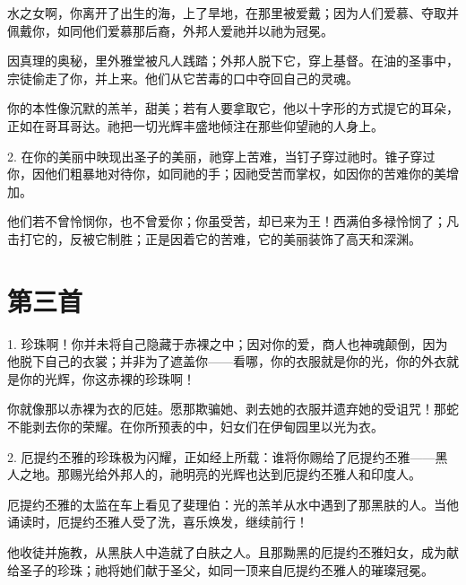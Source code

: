 水之女啊，你离开了出生的海，上了旱地，在那里被爱戴；因为人们爱慕、夺取并佩戴你，如同他们爱慕那后裔，外邦人爱祂并以祂为冠冕。\par

因真理的奥秘，里外雅堂被凡人践踏；外邦人脱下它，穿上基督。在油的圣事中，宗徒偷走了你，并上来。他们从它苦毒的口中夺回自己的灵魂。\par

你的本性像沉默的羔羊，甜美；若有人要拿取它，他以十字形的方式提它的耳朵，正如在哥耳哥达。祂把一切光辉丰盛地倾注在那些仰望祂的人身上。\par

2. 在你的美丽中映现出圣子的美丽，祂穿上苦难，当钉子穿过祂时。锥子穿过你，因他们粗暴地对待你，如同祂的手；因祂受苦而掌权，如因你的苦难你的美增加。\par

他们若不曾怜悯你，也不曾爱你；你虽受苦，却已来为王！西满伯多禄怜悯了；凡击打它的，反被它制胜；正是因着它的苦难，它的美丽装饰了高天和深渊。\par


\section{第三首}

1. 珍珠啊！你并未将自己隐藏于赤裸之中；因对你的爱，商人也神魂颠倒，因为他脱下自己的衣裳；并非为了遮盖你——看哪，你的衣服就是你的光，你的外衣就是你的光辉，你这赤裸的珍珠啊！\par

你就像那以赤裸为衣的厄娃。愿那欺骗她、剥去她的衣服并遗弃她的受诅咒！那蛇不能剥去你的荣耀。在你所预表的中，妇女们在伊甸园里以光为衣。\par

2. 厄提约丕雅的珍珠极为闪耀，正如经上所载：谁将你赐给了厄提约丕雅——黑人之地。那赐光给外邦人的，祂明亮的光辉也达到厄提约丕雅人和印度人。\par

厄提约丕雅的太监在车上看见了斐理伯：光的羔羊从水中遇到了那黑肤的人。当他诵读时，厄提约丕雅人受了洗，喜乐焕发，继续前行！\par

他收徒并施教，从黑肤人中造就了白肤之人。且那黝黑的厄提约丕雅妇女，成为献给圣子的珍珠；祂将她们献于圣父，如同一顶来自厄提约丕雅人的璀璨冠冕。\par

